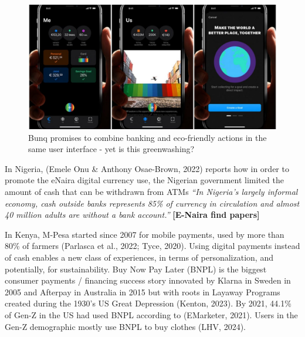 \documentclass[
  12pt,
  letterpaper,
  DIV=11,
  numbers=noendperiod]{scrartcl}
\begin{document}
\begin{figure}[H]

{\centering \includegraphics[width=1\linewidth,height=\textheight,keepaspectratio]{./images/finance/bunq.jpg}

}

\caption{Bunq promises to combine banking and eco-friendly actions in
the same user interface - yet is this greenwashing?}

\end{figure}%

In Nigeria, (Emele Onu \& Anthony Osae-Brown, 2022) reports how in order
to promote the eNaira digital currency use, the Nigerian government
limited the amount of cash that can be withdrawn from ATMs \emph{``In
Nigeria's largely informal economy, cash outside banks represents 85\%
of currency in circulation and almost 40 million adults are without a
bank account.''} \textbf{{[}E-Naira find papers{]}}

In Kenya, M-Pesa started since 2007 for mobile payments, used by more
than 80\% of farmers (Parlasca et al., 2022; Tyce, 2020). Using digital
payments instead of cash enables a new class of experiences, in terms of
personalization, and potentially, for sustainability. Buy Now Pay Later
(BNPL) is the biggest consumer payments / financing success story
innovated by Klarna in Sweden in 2005 and Afterpay in Australia in 2015
but with roots in Layaway Programs created during the 1930's US Great
Depression (Kenton, 2023). By 2021, 44.1\% of Gen-Z in the US had used
BNPL according to (EMarketer, 2021). Users in the Gen-Z demographic
mostly use BNPL to buy clothes (LHV, 2024).
\end{document}
